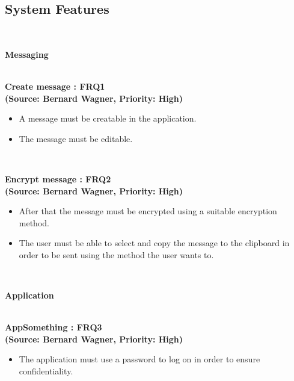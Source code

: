 \subsection{System Features}

\textbf{\\}


\Large{\textbf{Messaging}}\\
\normalsize
\textbf{\\}


\textbf{Create message : FRQ1}\\%
\textbf{(Source: Bernard Wagner, Priority: High)}\\
\begin{itemize}
\item A message must be creatable in the application.
\item The message must be editable.
\end{itemize}

\textbf{\\}

\textbf{Encrypt message : FRQ2}\\%
\textbf{(Source: Bernard Wagner, Priority: High)}\\
\begin{itemize}
\item After that the message must be encrypted using a suitable encryption method.
\item The user must be able to select and copy the message to the clipboard in order to be sent using the method the user wants to.
\end{itemize}

\textbf{\\}


\Large{\textbf{Application}}\\
\normalsize
\textbf{\\}


\textbf{AppSomething : FRQ3}\\%
\textbf{(Source: Bernard Wagner, Priority: High)}\\
\begin{itemize}
\item The application must use a password to log on in order to ensure confidentiality.
\end{itemize}